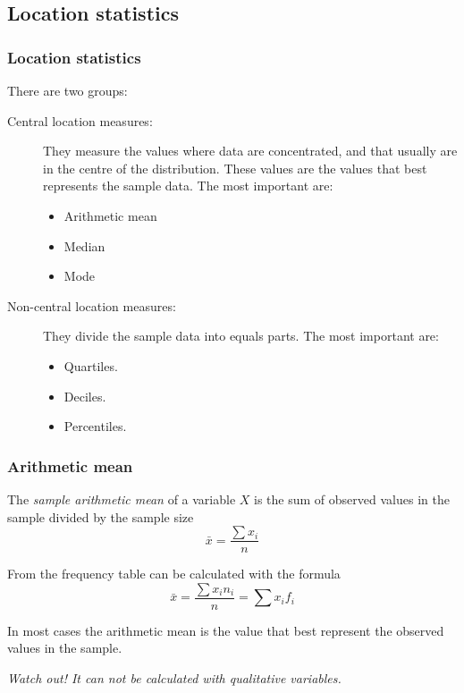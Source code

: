 \subsection{Location statistics}

\begin{frame}
\frametitle{Location statistics}
There are two groups: 

\begin{description}
\item [Central location measures:] They measure the values where data are concentrated, and that usually are in the
centre of the distribution. 
These values are the values that best represents the sample data. 
The most important are:
\begin{itemize}
\item Arithmetic mean
\item Median
\item Mode
\end{itemize}
\item [Non-central location measures:] They divide the sample data into equals parts. 
The most important are:
\begin{itemize}
\item Quartiles.
\item Deciles.
\item Percentiles. 
\end{itemize}
\end{description}
\end{frame}


\begin{frame}
\frametitle{Arithmetic mean}
\begin{definition}
The \emph{sample arithmetic mean} of a variable $X$ is the sum of observed values in the sample divided by the sample
size
\[
\bar{x} = \frac{\sum x_i}{n}
\]
\end{definition}
From the frequency table can be calculated with the formula
\[
\bar{x} = \frac{\sum x_in_i}{n} = \sum x_i f_i
\]

In most cases the arithmetic mean is the value that best represent the observed values in the sample. 
\begin{center}
\alert{\emph{Watch out! It can not be calculated with qualitative variables.}}
\end{center}
\end{frame}



